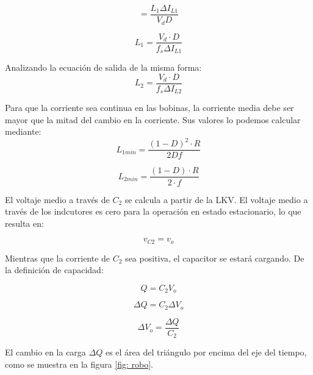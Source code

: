 \documentclass[conference]{IEEEtran}
\begin{document}
\begin{equation}
    =\frac{L_1\Delta I_{L1}}{V_d D}
\end{equation}

\begin{equation}
    L_1=\frac{V_d\cdot D}{f_s\Delta I_{L1}}
\end{equation}

Analizando la ecuación de salida de la misma forma:
\begin{equation}
    L_2=\frac{V_d\cdot D}{f_s\Delta I_{L2}}
\end{equation}

Para que la corriente sea continua en las bobinas, la corriente media debe ser mayor que la mitad del cambio en la corriente. Sus valores lo podemos calcular mediante:
\begin{equation}
    L_{1min}=\frac{(1-D)^2\cdot R}{2Df}    
\end{equation}

\begin{equation}
    L_{2min}=\frac{(1-D)\cdot R}{2\cdot f}
\end{equation}

El voltaje medio a través de $C_2$ se calcula a partir de la LKV. El voltaje medio a través de los indcutores es cero para la operación en estado estacionario, lo que resulta en:

\begin{equation}
    v_{C2}= v_o
\end{equation}

Mientras que la corriente de $C_2$ sea positiva, el capacitor se estará cargando. De la definición de capacidad:

\begin{equation}
    Q=C_2V_o
\end{equation}

\begin{equation}
    \Delta Q=C_2\Delta V_o
\end{equation}

\begin{equation}
    \Delta V_o=\frac{\Delta Q}{C_2}
\end{equation}

El cambio en la carga $\Delta Q$ es el área del triángulo por encima del eje del tiempo, como se muestra en la figura \ref{fig: robo}.
\end{document}
